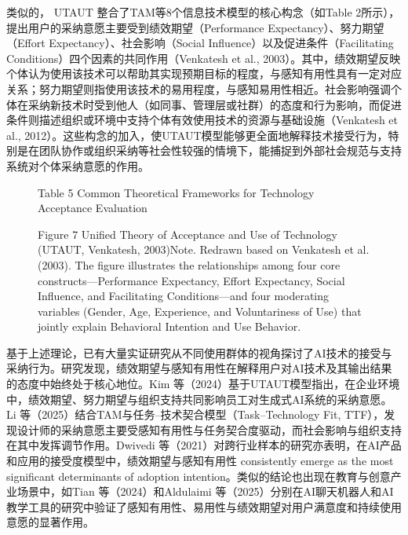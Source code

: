 类似的， UTAUT 整合了TAM等8个信息技术模型的核心构念（如Table 2所示），提出用户的采纳意愿主要受到绩效期望（Performance Expectancy）、努力期望（Effort Expectancy）、社会影响（Social Influence）以及促进条件（Facilitating Conditions）四个因素的共同作用（Venkatesh et al., 2003）。其中，绩效期望反映个体认为使用该技术可以帮助其实现预期目标的程度，与感知有用性具有一定对应关系；努力期望则指使用该技术的易用程度，与感知易用性相近。社会影响强调个体在采纳新技术时受到他人（如同事、管理层或社群）的态度和行为影响，而促进条件则描述组织或环境中支持个体有效使用技术的资源与基础设施（Venkatesh et al., 2012）。这些构念的加入，使UTAUT模型能够更全面地解释技术接受行为，特别是在团队协作或组织采纳等社会性较强的情境下，能捕捉到外部社会规范与支持系统对个体采纳意愿的作用。

\begin{figure}[htbp]

  \centering



  \caption{Table 5 Common Theoretical Frameworks for Technology Acceptance Evaluation}

  \label{fig:table_5_common_theoretical_frameworks_fo}

\end{figure}

\begin{figure}[htbp]

  \centering



  \caption{Figure 7 Unified Theory of Acceptance and Use of Technology (UTAUT, Venkatesh, 2003)Note. Redrawn based on Venkatesh et al. (2003). The figure illustrates the relationships among four core constructs—Performance Expectancy, Effort Expectancy, Social Influence, and Facilitating Conditions—and four moderating variables (Gender, Age, Experience, and Voluntariness of Use) that jointly explain Behavioral Intention and Use Behavior.}

  \label{fig:figure_7_unified_theory_of_acceptance_an}

\end{figure}

基于上述理论，已有大量实证研究从不同使用群体的视角探讨了AI技术的接受与采纳行为。研究发现，绩效期望与感知有用性在解释用户对AI技术及其输出结果的态度中始终处于核心地位。Kim 等（2024）基于UTAUT模型指出，在企业环境中，绩效期望、努力期望与组织支持共同影响员工对生成式AI系统的采纳意愿。Li 等（2025）结合TAM与任务–技术契合模型（Task–Technology Fit, TTF），发现设计师的采纳意愿主要受感知有用性与任务契合度驱动，而社会影响与组织支持在其中发挥调节作用。Dwivedi 等（2021）对跨行业样本的研究亦表明，在AI产品和应用的接受度模型中，绩效期望与感知有用性 consistently emerge as the most significant determinants of adoption intention。类似的结论也出现在教育与创意产业场景中，如Tian 等（2024）和Aldulaimi 等（2025）分别在AI聊天机器人和AI教学工具的研究中验证了感知有用性、易用性与绩效期望对用户满意度和持续使用意愿的显著作用。

